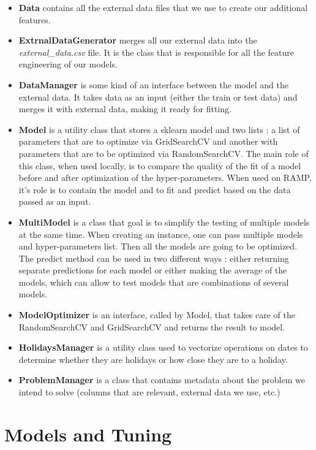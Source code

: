 \documentclass[a4paper,12pt,twoside]{article}
\begin{document}
\begin{itemize}
	\item \textbf{Data} contains all the external data files that we use to create our additional features.
	\item \textbf{ExtrnalDataGenerator} merges all our external data into the \textit{external_data.csv} file. It is the class that is responsible for all the feature engineering of our models.
	\item \textbf{DataManager} is some kind of an interface between the model and the external data. It takes data as an input (either the train or test data) and merges it with external data, making it ready for fitting.
	\item \textbf{Model} is a utility class that stores a sklearn model and two lists : a list of parameters that are to optimize via GridSearchCV and another with parameters that are to be optimized via RandomSearchCV. The main role of this class, when used locally, is to compare the quality of the fit of a model before and after optimization of the hyper-parameters. When used on RAMP, it's role is to contain the model and to fit and predict based on the data passed as an input.
	\item \textbf{MultiModel} is a class that goal is to simplify the testing of multiple models at the same time. When creating an instance, one can pass multiple models and hyper-parameters list. Then all the models are going to be optimized. The predict method can be used in two different ways : either returning separate predictions for each model or either making the average of the models, which can allow to test models that are combinations of several models.
	\item \textbf{ModelOptimizer} is an interface, called by Model, that takes care of the RandomSearchCV and GridSearchCV and returns the result to model.
	\item \textbf{HolidaysManager} is a utility class used to vectorize operations on dates to determine whether they are holidays or how close they are to a holiday.
	\item \textbf{ProblemManager} is a class that contains metadata about the problem we intend to solve (columns that are relevant, external data we use, etc.)
\end{itemize}

\section{Models and Tuning}
\end{document}
